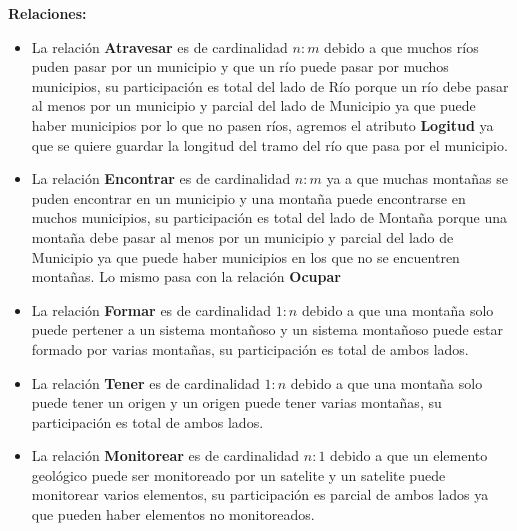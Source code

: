 \documentclass[letterpaper,11pt]{article}
\begin{document}
\begin{itemize}
\begin{itemize}
      \textbf{Relaciones: }
      \begin{itemize}
      \item La relación \textbf{Atravesar} es de cardinalidad $n:m$ debido
            a que muchos ríos puden pasar por un municipio y que un río puede
            pasar por muchos municipios, su participación es total del lado de
            Río porque un río debe pasar al menos por un municipio y parcial del
            lado de Municipio ya que puede haber municipios por lo que no pasen ríos,
            agremos el atributo \textbf{Logitud} ya que se quiere guardar la longitud
            del tramo del río que pasa por el municipio.
      \item La relación \textbf{Encontrar} es de cardinalidad $n:m$ ya
            a que muchas montañas se puden encontrar en un municipio y una montaña puede
            encontrarse en muchos municipios, su participación es total del lado de
           Montaña porque una montaña debe pasar al menos por un municipio y parcial del
           lado de Municipio ya que puede haber municipios en los que no se encuentren
           montañas. Lo mismo pasa con la relación \textbf{Ocupar}

      \item La relación \textbf{Formar} es de cardinalidad $1:n$ debido a que una montaña
            solo puede pertener a un sistema montañoso y un sistema montañoso puede estar
            formado por varias montañas, su participación es total de ambos lados.

      \item La relación \textbf{Tener} es de cardinalidad $1:n$ debido a que una montaña
            solo puede tener un origen y un origen puede tener varias montañas, su
            participación es total de ambos lados.

      \item La relación \textbf{Monitorear} es de cardinalidad $n:1$ debido a que un
            elemento geológico puede ser monitoreado por un satelite y un satelite puede
            monitorear varios elementos, su participación es parcial de ambos lados ya que
            pueden haber elementos no monitoreados.
      \end{itemize}



    \end{itemize}
\end{itemize}
\end{document}
